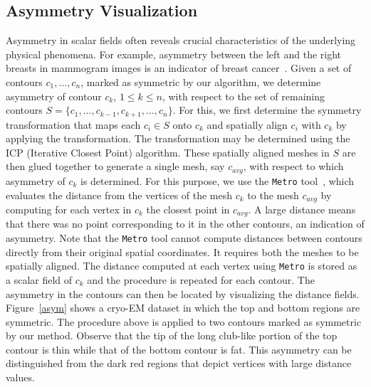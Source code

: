 \documentclass[review,journal]{vgtc}         %
\begin{document}
\subsection{Asymmetry Visualization}
Asymmetry in scalar fields often reveals crucial characteristics of the underlying
physical phenomena. For example, asymmetry between 
the left and the right breasts in mammogram images is an indicator of breast 
cancer~\cite{tahmoush2007improved}.
Given a set of contours $c_1,\dots,c_n$, marked as symmetric
by our algorithm, we determine asymmetry of contour $c_k$, $1 \leq k \leq n$, with
respect to the set of remaining contours $S = \{c_1, \dots, c_{k-1}, c_{k+1}, \dots, c_n\}$.
For this, we first determine the symmetry transformation that maps each $c_i \in S$ onto
$c_k$ and spatially align $c_i$ with $c_k$ by applying the transformation. 
The transformation may be determined using the ICP (Iterative Closest Point) algorithm.
These spatially aligned meshes in $S$ are then glued together to generate a single mesh, say $c_{avg}$, 
with respect to which asymmetry of $c_k$ is determined. For this purpose, we use the 
\texttt{Metro} tool~\cite{CigRS98}, which evaluates the distance from the vertices of the mesh 
$c_k$ to the mesh $c_{avg}$ by computing for each vertex in $c_k$ the closest point in $c_{avg}$. 
A large distance means that there was no point corresponding to it in the other contours,
an indication of asymmetry. Note that the \texttt{Metro} tool cannot compute distances 
between contours directly from their original spatial coordinates. 
It requires both the meshes to be spatially aligned. 
The distance computed at each vertex using \texttt{Metro} is stored as a scalar field of 
$c_k$ and the procedure is repeated
for each contour. The asymmetry in the contours can then be located by visualizing the distance fields.
Figure~\ref{asym} shows a cryo-EM dataset in which the top and bottom regions are symmetric. The procedure
above is applied to two contours marked as symmetric by our method. Observe that the tip of the long
club-like portion of the top contour is thin while that of the bottom contour is fat. This asymmetry
can be distinguished from the dark red regions that depict vertices with large distance values.
\end{document}
